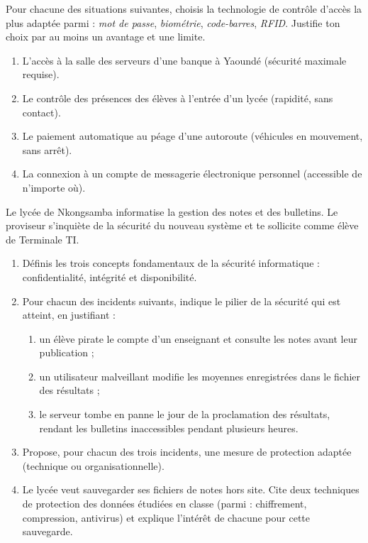 \documentclass[11pt]{article}
\newcommand{\cle}[1]{{\popxbold\color{popdark}#1}}
\newcounter{popsec}
\newcounter{popsub}
\newcommand{\courssub}[1]{%
  \stepcounter{popsub}%
  \par\vspace{9pt}\noindent{\popxbold\fontsize{11.5}{13}\selectfont\color{popink}{\color{poporange}\thepopsec.\thepopsub}\hspace{6pt}#1}\par\nopagebreak\vspace{4pt}
}
\begin{document}
\begin{exercice}
Pour chacune des situations suivantes, choisis la technologie de contrôle d'accès la plus adaptée parmi : \emph{mot de passe}, \emph{biométrie}, \emph{code-barres}, \emph{RFID}. Justifie ton choix par au moins un avantage et une limite.
\begin{enumerate}
\item L'accès à la salle des serveurs d'une banque à Yaoundé (sécurité maximale requise).
\item Le contrôle des présences des élèves à l'entrée d'un lycée (rapidité, sans contact).
\item Le paiement automatique au péage d'une autoroute (véhicules en mouvement, sans arrêt).
\item La connexion à un compte de messagerie électronique personnel (accessible de n'importe où).
\end{enumerate}
\end{exercice}

\courssub{Je me prépare au Bac}

\begin{exercice}
Le lycée de Nkongsamba informatise la gestion des notes et des bulletins. Le proviseur s'inquiète de la sécurité du nouveau système et te sollicite comme élève de Terminale TI.
\begin{enumerate}
\item Définis les trois concepts fondamentaux de la sécurité informatique : \cle{confidentialité}, \cle{intégrité} et \cle{disponibilité}.
\item Pour chacun des incidents suivants, indique le pilier de la sécurité qui est atteint, en justifiant :
\begin{enumerate}
\item un élève pirate le compte d'un enseignant et consulte les notes avant leur publication ;
\item un utilisateur malveillant modifie les moyennes enregistrées dans le fichier des résultats ;
\item le serveur tombe en panne le jour de la proclamation des résultats, rendant les bulletins inaccessibles pendant plusieurs heures.
\end{enumerate}
\item Propose, pour chacun des trois incidents, une mesure de protection adaptée (technique ou organisationnelle).
\item Le lycée veut sauvegarder ses fichiers de notes hors site. Cite deux techniques de protection des données étudiées en classe (parmi : chiffrement, compression, antivirus) et explique l'intérêt de chacune pour cette sauvegarde.
\end{enumerate}
\end{exercice}
\end{document}
